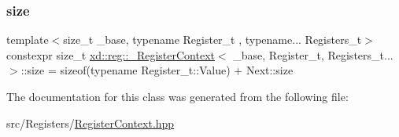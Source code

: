 \subsubsection{\texorpdfstring{size}{size}}
{\footnotesize\ttfamily template$<$size\+\_\+t \+\_\+base, typename Register\+\_\+t , typename... Registers\+\_\+t$>$ \\
constexpr size\+\_\+t \mbox{\hyperlink{classxd_1_1reg_1_1___register_context}{xd\+::reg\+::\+\_\+\+Register\+Context}}$<$ \+\_\+base, Register\+\_\+t, Registers\+\_\+t... $>$\+::size = sizeof(typename Register\+\_\+t\+::\+Value) + Next\+::size\hspace{0.3cm}{\ttfamily [static]}}



The documentation for this class was generated from the following file\+:\begin{DoxyCompactItemize}
\item 
src/\+Registers/\mbox{\hyperlink{_register_context_8hpp}{Register\+Context.\+hpp}}\end{DoxyCompactItemize}
